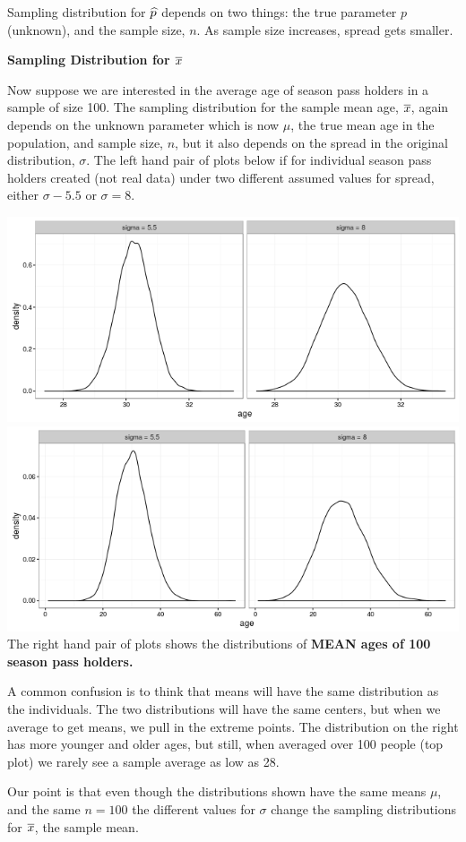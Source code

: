Sampling distribution for $\widehat{p}$ depends on two things: the true
parameter $p$ (unknown), and the sample size, $n$. As sample size
increases, spread gets smaller. \vspace{1in}

\begin{center}
  {\bf Sampling Distribution for $\overline{x}$}
\end{center}
 Now suppose we are interested in the average age of season pass
 holders in a sample of size 100. The sampling distribution  for the
 sample mean age, $\overline{x}$, 
 again depends on the  unknown parameter which is now $\mu$, the true
 mean age in the population,  and sample size, $n$,
 but it also depends on the spread in the original distribution,
 $\sigma$.  
 The left hand pair of plots below if for individual season pass
 holders created (not real data) under two different assumed values
 for spread, either $\sigma - 5.5$ or $\sigma = 8$.

\includegraphics[width =.48\linewidth]{plots/twoSampDensities4xbar.png}
\hfill
\includegraphics[width =.48\linewidth]{plots/twoSampDensities4x.png}\\

 The right hand pair of plots  shows the distributions of {\bf MEAN ages of 100
   season pass holders.} 

 A common confusion is to think that means will have the same
 distribution as the individuals. The two distributions will have the
 same centers, but when we average to get means, we pull in the
 extreme points.  The distribution on the right has more younger and
 older ages, but still, when averaged over 100 people (top plot) we
 rarely see a sample average as low as 28.

 Our point is that even though the distributions shown have the same
 means $\mu$, and the same $n =  100$ the different values for
 $\sigma$ change the sampling distributions for $\overline{x}$, the sample mean. 



